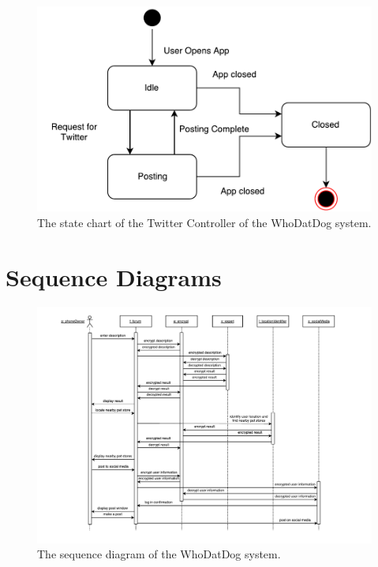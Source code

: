 \documentclass[]{article}
\begin{document}
\begin{figure}[H]
	\centering
	\includegraphics[width=\textwidth]{TwitterController.pdf}
	\caption{\label{fig:analysisclassdiagram}The state chart of the Twitter Controller of the WhoDatDog system.}
\end{figure}




\section{Sequence Diagrams}
\label{sec:sequence_diagrams}
\begin{figure}[H]
	\centering
	\includegraphics[width=\textwidth]{sequencediagram.pdf}
	\caption{\label{fig:analysisclassdiagram}The sequence diagram of the WhoDatDog system.}
\end{figure}
\end{document}
